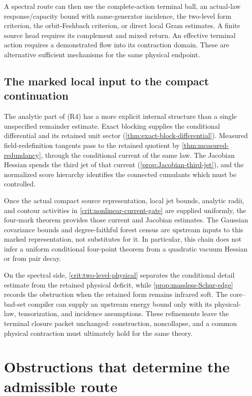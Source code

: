 \documentclass[11pt,oneside,openany]{book}
\theoremstyle{definition}
\theoremstyle{remark}
\begin{document}
A spectral route can then use the complete-action terminal ball, an
actual-law response/capacity bound with same-generator incidence, the
two-level form criterion, the orbit-Feshbach criterion, or direct local
Gram estimates. A finite source
head requires its complement and mixed return. An effective terminal
action requires a demonstrated flow into its contraction domain. These
are alternative sufficient mechanisms for the same physical endpoint.

\subsection{The marked local input to the compact continuation}
The analytic part of (R4) has a more explicit internal structure than a
single unspecified remainder estimate. Exact blocking supplies the
conditional differential and its retained unit sector
(\cref{thm:exact-block-differential}). Measured field-redefinition
tangents pass to the retained quotient by
\cref{thm:measured-redundancy}, through the conditional current of the
same law. The Jacobian Hessian spends the third jet of that current
(\cref{prop:Jacobian-third-jet}), and the normalized score hierarchy
identifies the connected cumulants which must be controlled.

Once the actual compact source representation, local jet bounds,
analytic radii, and contour activities in
\cref{crit:nonlinear-current-gate} are supplied uniformly, the
four-mark theorem provides those current and Jacobian estimates. The
Gaussian covariance bounds and degree-faithful forest census are
upstream inputs to this marked representation, not substitutes for
it. In particular, this chain does not infer a uniform conditional
four-point theorem from a quadratic vacuum Hessian or from pair decay.

On the spectral side, \cref{crit:two-level-physical} separates the
conditional detail estimate from the retained physical deficit, while
\cref{prop:massless-Schur-edge} records the obstruction when the retained
form remains infrared soft. The core--bad-set compiler can supply an
upstream energy bound only with its physical-law, tensorization, and
incidence assumptions. These refinements leave the terminal closure
packet unchanged: construction, noncollapse, and a common physical
contraction must ultimately hold for the same theory.

\section{Obstructions that determine the admissible route}
\end{document}
